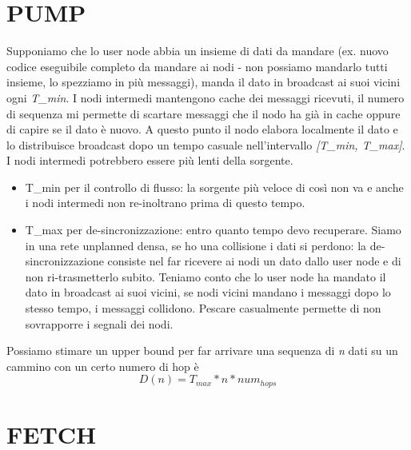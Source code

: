 \documentclass[12pt,italian]{report}
\begin{document}
\section{PUMP}
\label{sec:pUMP}
Supponiamo che lo user node abbia un insieme di dati da mandare (ex. nuovo codice eseguibile completo da mandare ai nodi - non possiamo mandarlo tutti insieme, lo spezziamo in più messaggi), manda il dato in broadcast ai suoi vicini ogni \textit{T\_min}. I nodi intermedi mantengono cache dei messaggi ricevuti, il numero di sequenza mi permette di scartare messaggi che il nodo ha già in cache oppure di capire se il dato è nuovo. A questo punto il nodo elabora localmente il dato e lo distribuisce broadcast dopo un tempo casuale nell'intervallo \textit{[T\_min, T\_max]}. I nodi intermedi potrebbero essere più lenti della sorgente.  
\begin{itemize}
    \item T\_min per il controllo di flusso: la sorgente più veloce di così non va e anche i nodi intermedi non re-inoltrano prima di questo tempo. 
    \item T\_max per de-sincronizzazione: entro quanto tempo devo recuperare. Siamo in una rete unplanned densa, se ho una collisione i dati si perdono: la de-sincronizzazione consiste nel far ricevere ai nodi un dato dallo user node e di non ri-trasmetterlo subito. Teniamo conto che lo user node ha mandato il dato in broadcast ai suoi vicini, se nodi vicini mandano i messaggi dopo lo stesso tempo, i messaggi collidono. Pescare casualmente permette di non sovrapporre i segnali dei nodi. 
\end{itemize}
Possiamo stimare un upper bound per far arrivare una sequenza di \textit{n} dati su un cammino con un certo numero di hop è
\begin{equation}
    D(n) = T_{max}*n*num_{hops}
\end{equation}

\section{FETCH}
\end{document}
